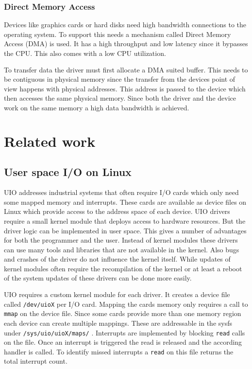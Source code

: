 \documentclass[
a4paper,
12pt,
notitlepage,
parskip=half,
DIV=11,
]{scrbook}
\begin{document}
		\subsection{Direct Memory Access}
		
		Devices like graphics cards or hard disks need high bandwidth connections to the operating system.
		To support this needs a mechanism called Direct Memory Access (DMA) is used.
		It has a high throughput and low latency since it bypasses the CPU.
		This also comes with a low CPU utilization. \citep{dma}
		
		To transfer data the driver must first allocate a DMA suited buffer.
		This needs to be contiguous in physical memory since the transfer from the devices point of view happens with physical addresses.
		This address is passed to the device which then accesses the same physical memory. Since both the driver and the device work on the same memory a high data bandwidth is achieved. \citep{books/daglib/0012446}
	
	\chapter{Related work}
		
		\section{User space I/O on Linux}
		
		UIO addresses industrial systems that often require I/O cards which only need some mapped memory and interrupts.
		These cards are available as device files on Linux which provide access to the address space of each device.
		UIO drivers require a small kernel module that deploys access to hardware resources.
		But the driver logic can be implemented in user space.
		This gives a number of advantages for both the programmer and the user.
		Instead of kernel modules these drivers can use many tools and libraries that are not available in the kernel.
		Also bugs and crashes of the driver do not influence the kernel itself.
		While updates of kernel modules often require the recompilation of the kernel or at least a reboot of the system updates of these drivers can be done more easily. \citep{uio}
		
		UIO requires a custom kernel module for each driver.
		It creates a device file called \texttt{/dev/uioX} per I/O card.
		Mapping the cards memory only requires a call to \texttt{mmap} on the device file.
		Since some cards provide more than one memory region each device can create multiple mappings.
		These are addressable in the sysfs \citep{sysfs} under \texttt{/sys/uio/uioX/maps/} \citep{uio}.
		Interrupts are implemented by blocking \texttt{read} calls on the file.
		Once an interrupt is triggered the read is released and the according handler is called.
		To identify missed interrupts a \texttt{read} on this file returns the total interrupt count. \citep{uio}
		
\end{document}

